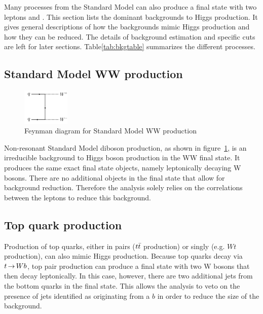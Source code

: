 Many processes from the Standard Model can also produce a final state with two leptons and \met. This section lists the dominant backgrounds to Higgs production. It gives general descriptions of how the backgrounds mimic Higgs production and how they can be reduced. The details of background estimation and specific cuts are left for later sections. Table\ref{tab:bkgtable} summarizes the different processes. 

\subsection{Standard Model WW production}

\begin{figure}[h!]
  \centering
  \captionsetup{justification=centering}

  \includegraphics[width=0.2\textwidth]{figures/Feyn_SMWW}
  \caption{Feynman diagram for Standard Model WW production}
  \label{fig:SMWWdiagram}
\end{figure}

Non-resonant Standard Model diboson production, as shown in figure~\ref{fig:SMWWdiagram}, is an irreducible background to Higgs boson production in the WW final state. It produces the same exact final state objects, namely leptonically decaying W bosons. There are no additional objects in the final state that allow for background reduction. Therefore the analysis solely relies on the correlations between the leptons to reduce this background. 

\subsection{Top quark production}

Production of top quarks, either in pairs ($t\bar{t}$ production) or singly (e.g. $Wt$ production), can also mimic Higgs production. Because top quarks decay via $t\,{\rightarrow}\, Wb$, top pair production can  produce a final state with two W bosons that then decay leptonically. In this case, however, there are two additional jets from the bottom quarks in the final state. This allows the analysis to veto on the presence of jets identified as originating from a $b$ in order to reduce the size of the background. 

